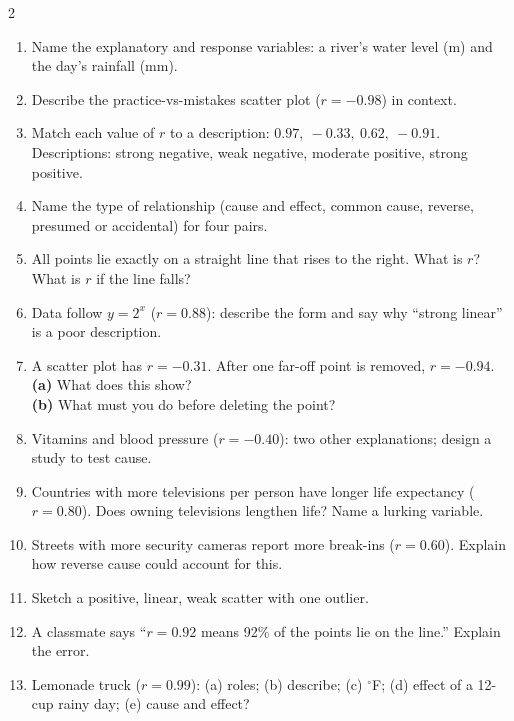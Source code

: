 \documentclass[11pt]{article}
\begin{document}
\begin{recapbox}
\begin{multicols}{2}
\small
\begin{enumerate}[leftmargin=*,itemsep=3pt]
  \item Name the explanatory and response variables: a river's water level (m) and the day's rainfall (mm).
  \item Describe the practice-vs-mistakes scatter plot ($r=-0.98$) in context.
  \item Match each value of $r$ to a description: $0.97,\ -0.33,\ 0.62,\ -0.91$. Descriptions: strong negative, weak negative, moderate positive, strong positive.
  \item Name the type of relationship (cause and effect, common cause, reverse, presumed or accidental) for four pairs.
  \item All points lie exactly on a straight line that rises to the right. What is $r$? What is $r$ if the line falls?
  \item Data follow $y=2^x$ ($r=0.88$): describe the form and say why \textquotedblleft{}strong linear\textquotedblright{} is a poor description.
  \item A scatter plot has $r=-0.31$. After one far-off point is removed, $r=-0.94$. \\ \textbf{(a)} What does this show? \\ \textbf{(b)} What must you do before deleting the point?
  \item Vitamins and blood pressure ($r=-0.40$): two other explanations; design a study to test cause.
  \item Countries with more televisions per person have longer life expectancy ($r=0.80$). Does owning televisions lengthen life? Name a lurking variable.
  \item Streets with more security cameras report more break-ins ($r=0.60$). Explain how reverse cause could account for this.
  \item Sketch a positive, linear, weak scatter with one outlier.
  \item A classmate says \textquotedblleft{}$r=0.92$ means 92\% of the points lie on the line.\textquotedblright{} Explain the error.
  \item Lemonade truck ($r=0.99$): (a) roles; (b) describe; (c) $^\circ$F; (d) effect of a 12-cup rainy day; (e) cause and effect?
\end{enumerate}
\end{multicols}
\end{recapbox}
\end{document}
